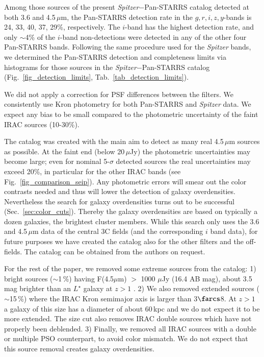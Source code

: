 \documentclass[mathleft,fleqn,%
]{an}
\begin{document}
Among those
sources of the present {\it Spitzer}$-$Pan-STARRS catalog 
detected at both 3.6 and 4.5\,$\mu$m, the Pan-STARRS
detection rate in the $g,r,i, z,y$-bands is 24, 33, 40, 37, 29\%, respectively. 
The $i$-band has the highest detection rate, 
and only $\sim$4\% of the $i$-band non-detections were detected in any of
the other four Pan-STARRS bands. 
Following the same procedure used for the {\it Spitzer} bands, we
determined the  
Pan-STARRS detection and completeness limits via
histograms for those sources in the {\it Spitzer}$-$Pan-STARRS catalog
(Fig.~\ref{fig_detection_limits}, Tab.~\ref{tab_detection_limits}).

We did not apply a correction for PSF differences between the
filters.
We consistently use Kron photometry for both Pan-STARRS and {\it Spitzer}
data. We expect any bias to be small compared to the photometric
uncertainty of the faint IRAC 
sources (10-30\%). 

The catalog was created with the main aim to detect as many real
4.5\,$\mu$m sources as possible. At the faint end (below 20\,$\mu$Jy)
the photometric uncertainties may become large; even for nominal
5-$\sigma$ detected sources the real uncertainties may exceed 20\%, in
particular for the other IRAC bands
(see Fig.~\ref{fig_comparison_seip}). 
Any photometric errors will smear out the color contrasts needed and thus
will lower the detection of galaxy overdensities.  
Nevertheless the search for galaxy overdensities turns out to be
successful (Sec.~\ref{sec:color_cuts}).
Thereby the galaxy overdensities are based on typically a dozen
galaxies, the brightest cluster members.
While this search only uses the 3.6 and 4.5\,$\mu$m data of the
central 3C fields (and the corresponding $i$ band data), for future purposes 
we have created the catalog also for the other
filters and the off-fields.
The catalog can be obtained from the authors on request.

For the rest of the paper, we removed some extreme sources from the catalog:
1) bright sources ($\sim$1\,\%) 
having F(4.5$\mu$m) $>$ 1000 $\mu$Jy (16.4 AB mag), 
about 3.5 mag brighter than an $L^{\star}$ galaxy at $z>1$
\citep{Wylezalek14}. 
2) We also removed extended sources ($\sim$15\,\%) where the IRAC Kron
semimajor axis is larger than 3$\farcs$8. At $z>1$ a galaxy of this size
has a diameter of about 60\,kpc and we do not expect it to be more
extended.
The size cut also removes IRAC double sources which have not properly
been deblended.
3) Finally, we removed all IRAC sources with a double or multiple  PSO
counterpart, to avoid color mismatch. We do not expect that this source removal creates galaxy overdensities.
\end{document}
